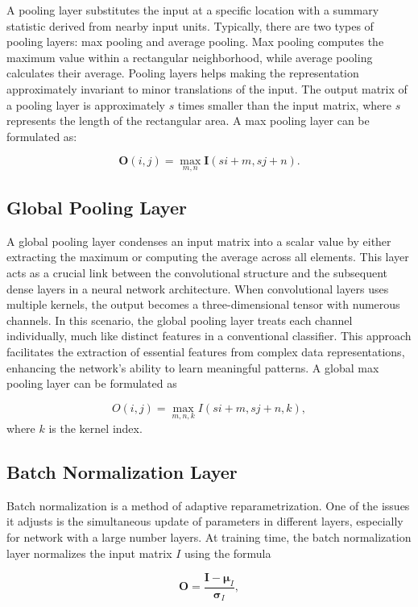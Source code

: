 \documentclass[]{interact}
\theoremstyle{plain}%
\theoremstyle{definition}
\theoremstyle{remark}
\begin{document}
A pooling layer substitutes the input at a specific location with a
summary statistic derived from nearby input units. Typically, there are
two types of pooling layers: max pooling and average pooling. Max
pooling computes the maximum value within a rectangular neighborhood,
while average pooling calculates their average. Pooling layers helps
making the representation approximately invariant to minor translations
of the input. The output matrix of a pooling layer is approximately
\(s\) times smaller than the input matrix, where \(s\) represents the
length of the rectangular area. A max pooling layer can be formulated
as:

\[\boldsymbol{O}(i, j) = \underset{m,n}{\max} \boldsymbol{I}(si + m,sj+n).\]

\subsection{Global Pooling Layer}\label{global-pooling-layer}

A global pooling layer condenses an input matrix into a scalar value by
either extracting the maximum or computing the average across all
elements. This layer acts as a crucial link between the convolutional
structure and the subsequent dense layers in a neural network
architecture. When convolutional layers uses multiple kernels, the
output becomes a three-dimensional tensor with numerous channels. In
this scenario, the global pooling layer treats each channel
individually, much like distinct features in a conventional classifier.
This approach facilitates the extraction of essential features from
complex data representations, enhancing the network's ability to learn
meaningful patterns. A global max pooling layer can be formulated as

\[O(i, j) = \underset{m,n,k}{\max} I(si + m,sj+n,k),\] where \(k\) is
the kernel index.

\subsection{Batch Normalization Layer}\label{batch-normalization-layer}

Batch normalization is a method of adaptive reparametrization. One of
the issues it adjusts is the simultaneous update of parameters in
different layers, especially for network with a large number layers. At
training time, the batch normalization layer normalizes the input matrix
\(I\) using the formula

\[\boldsymbol{O} = \frac{\boldsymbol{I} - \boldsymbol{\mu}_I}{\boldsymbol{\sigma}_I},\]
\end{document}
